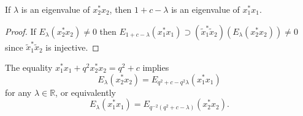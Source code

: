 \documentclass[pdftex]{sigma}
\begin{document}
\begin{corollary}\label{eigenvalue} If $\lambda$ is an eigenvalue of $x_{2}^{\ast}x_{2}$,
then $1+c-\lambda$ is an eigenvalue of $x_{1}^{\ast}x_{1}$.
\end{corollary}
\begin{proof} If $E_{\lambda}( x_{2}^{\ast}x_{2}) \neq0$ then
$E_{1+c-\lambda}( x_{1}^{\ast}x_{1}) \supset( \tilde{x}%
_{1}^{\ast}\tilde{x}_{2}) ( E_{\lambda}( x_{2}^{\ast}%
x_{2}) ) \neq0$ since $\tilde{x}_{1}^{\ast}\tilde{x}_{2}$ is injective.
\end{proof}

The equality $x_{1}^{\ast}x_{1}+q^{2}x_{2}^{\ast}x_{2}=q^{2}+c$ implies
\[
E_{\lambda}( x_{2}^{\ast}x_{2}) =E_{q^{2}+c-q^{2}\lambda}(
x_{1}^{\ast}x_{1})
\]
for any $\lambda\in\mathbb{R}$, or equivalently
\[
E_{\lambda}( x_{1}^{\ast}x_{1}) =E_{q^{-2}( q^{2}%
+c-\lambda) }( x_{2}^{\ast}x_{2}) .
\]
\end{document}
